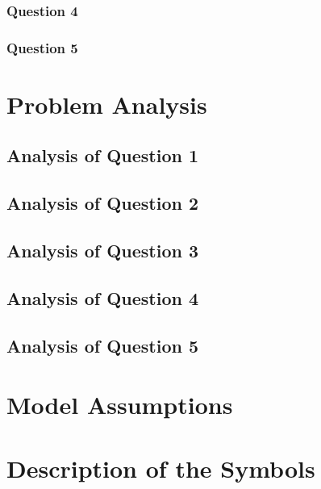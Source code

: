 \documentclass{apmcmthesis}
\begin{document}
\subsubsection{Question 4}


\subsubsection{Question 5}


\section{Problem Analysis}
\subsection{Analysis of Question 1}



\subsection{Analysis of Question 2}

\subsection{Analysis of Question 3}

\subsection{Analysis of Question 4}



\subsection{Analysis of Question 5}

\section{Model Assumptions}
\begin{enumerate}

\end{enumerate}


\section{Description of the Symbols}\label{sec:symbols}
\end{document}
